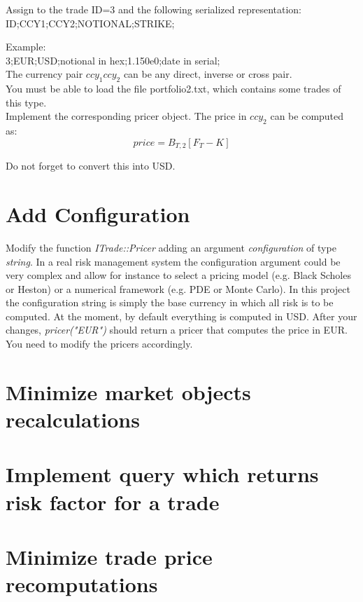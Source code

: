 \documentclass[10pt]{article}
\begin{document}
Assign to the trade ID=3 and the following serialized representation:\\
ID;CCY1;CCY2;NOTIONAL;STRIKE;

\noindent Example:\\
3;EUR;USD;notional in hex;1.150e0;date in serial;\\

The currency pair $ccy_1ccy_2$ can be any direct, inverse or cross pair.\\

You must be able to load the file portfolio2.txt, which contains some trades of this type.\\

Implement the corresponding pricer object. The price in $ccy_2$ can be computed as:
$$
price=B_{T,2}[F_T-K]
$$

Do not forget to convert this into USD.\\

\section{Add Configuration}
Modify the function \textit{ITrade::Pricer} adding an argument \textit{configuration} of type \textit{string}. In a real risk management system the configuration argument could be very complex and allow for instance to select a pricing model (e.g. Black Scholes or Heston) or a numerical framework (e.g. PDE or Monte Carlo). In this project the configuration string is simply the base currency in which all risk is to be computed. At the moment, by default everything is computed in USD. After your changes, \textit{pricer("EUR")} should return a pricer that computes the price in EUR.\\

You need to modify the pricers accordingly.

\section{Minimize market objects recalculations}

\section{Implement query which returns risk factor for a trade}

\section{Minimize trade price recomputations}
\end{document}
